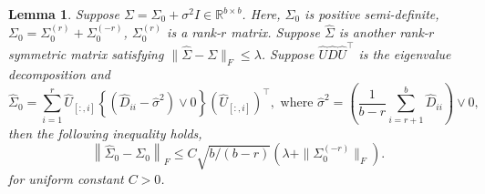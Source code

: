 \documentclass[11pt]{article}
\newtheorem{Lemma}{Lemma}
\newcommand{\0}{{\mathbf{0}}}
\newcommand{\1}{{\mathbf{1}}}
\begin{document}
\begin{Lemma}\label{lm:hat_Sigma-to-hat_Sigma_0}
	Suppose $\Sigma = \Sigma_0 + \sigma^2I\in \mathbb{R}^{b\times b}$. Here, $\Sigma_0$ is positive semi-definite, $\Sigma_0 = \Sigma_0^{(r)} + \Sigma_0^{(-r)}$, $\Sigma_0^{(r)}$ is a rank-$r$ matrix. Suppose $\hat{\Sigma}$ is another rank-$r$ symmetric matrix  satisfying $\|\hat{\Sigma} - \Sigma\|_F\leq \lambda$. Suppose $\hat{U}\hat{D}\hat{U}^\top$ is the eigenvalue decomposition and
	\begin{equation}
	\hat{\Sigma}_0 = \sum_{i=1}^r \hat{U}_{[:, i]} \left\{(\hat{D}_{ii} - \hat{\sigma}^2) \vee 0\right\} (\hat{U}_{[:, i]})^\top,  \text{ where } \hat{\sigma}^2 = \left(\frac{1}{b-r} \sum_{i=r+1}^b\hat{D}_{ii}\right)\vee 0, 
	\end{equation}
	then the following inequality holds,
	\begin{equation}
	\left\|\hat{\Sigma}_0 - \Sigma_0\right\|_F \leq C\sqrt{b/(b-r)}\left(\lambda + \|\Sigma_0^{(-r)}\|_F\right).
	\end{equation}
	for uniform constant $C>0$.
\end{Lemma}
\end{document}
